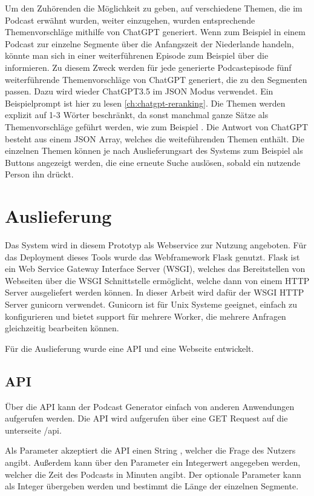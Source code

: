 Um den Zuhörenden die Möglichkeit zu geben, auf verschiedene Themen, die im Podcast erwähnt wurden, weiter einzugehen, wurden entsprechende Themenvorschläge mithilfe von ChatGPT generiert.
Wenn zum Beispiel in einem Podcast zur  einzelne Segmente über die Anfangszeit der Niederlande handeln, könnte man sich in einer weiterführenen Episode zum Beispiel über die  informieren.
Zu diesem Zweck werden für jede generierte Podcastepisode fünf weiterführende Themenvorschläge von ChatGPT generiert, die zu den Segmenten passen.
Dazu wird wieder ChatGPT3.5 im JSON Modus verwendet.
Ein Beispielprompt ist hier zu lesen \autoref{ch:chatgpt-reranking}.
Die Themen werden explizit auf 1-3 Wörter beschränkt, da sonst manchmal ganze Sätze als Themenvorschläge geführt werden, wie zum Beispiel .
Die Antwort von ChatGPT besteht aus einem JSON Array, welches die weiteführenden Themen enthält.
Die einzelnen Themen können je nach Auslieferungsart des Systems zum Beispiel als Buttons angezeigt werden, die eine erneute Suche auslösen, sobald ein nutzende Person ihn drückt.

\section{Auslieferung}

Das System wird in diesem Prototyp als Webservice zur Nutzung angeboten. 
Für das Deployment dieses Tools wurde das Webframework Flask genutzt.
Flask ist ein Web Service Gateway Interface Server (WSGI), welches das Bereitstellen von Webseiten über die WSGI Schnittstelle ermöglicht, welche dann von einem HTTP Server ausgeliefert werden können.
In dieser Arbeit wird dafür der WSGI HTTP Server gunicorn verwendet.
Gunicorn ist für Unix Systeme geeignet, einfach zu konfigurieren und bietet support für mehrere Worker, die mehrere Anfragen gleichzeitig bearbeiten können.

Für die Auslieferung wurde eine API und eine Webseite entwickelt.

\subsection{API}

Über die API kann der Podcast Generator einfach von anderen Anwendungen aufgerufen werden.
Die API wird aufgerufen über eine GET Request auf die unterseite /api.

Als Parameter akzeptiert die API einen String , welcher die Frage des Nutzers angibt.
Außerdem kann über den Parameter  ein Integerwert angegeben werden, welcher die Zeit des Podcasts in Minuten angibt.
Der optionale Parameter  kann als Integer übergeben werden und bestimmt die Länge der einzelnen Segmente.

